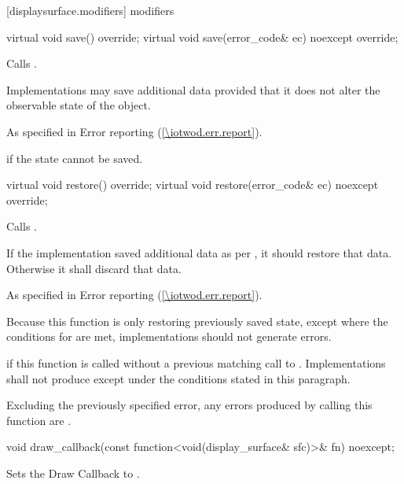  [displaysurface.modifiers]{ modifiers}

\begin{itemdecl}
virtual void save() override;
virtual void save(error_code& ec) noexcept override;
\end{itemdecl}
\begin{itemdescr}
\pnum
\effects
Calls .

\pnum
Implementations may save additional data provided that it does not alter the observable state of the  object.

\pnum
\throws
As specified in Error reporting (\ref{\iotwod.err.report}).

\pnum
\errors
{} if the state cannot be saved.
\end{itemdescr}

\begin{itemdecl}
virtual void restore() override;
virtual void restore(error_code& ec) noexcept override;
\end{itemdecl}
\begin{itemdescr}
\pnum
\effects
Calls .

\pnum
If the implementation saved additional data as per , it should restore that data. Otherwise it shall discard that data.

\pnum
\throws
As specified in Error reporting (\ref{\iotwod.err.report}).

\pnum
\remarks
Because this function is only restoring previously saved state, except where the conditions for  are met, implementations should not generate errors.

\pnum
\errors
{} if this function is called without a previous matching call to . Implementations shall not produce  except under the conditions stated in this paragraph.

\pnum
Excluding the previously specified error, any errors produced by calling this function are .
\end{itemdescr}

\begin{itemdecl}
void draw_callback(const function<void(display_surface& sfc)>& fn) noexcept;
\end{itemdecl}
\begin{itemdescr}
\pnum
\effects
Sets the Draw Callback to .
\end{itemdescr}


